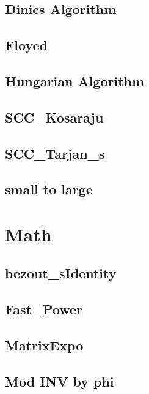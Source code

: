 ﻿\documentclass[10pt,twocolumn]{article}
\newcommand{\codefile}[1]{}}
\begin{document}
\subsection{Dinics Algorithm}
\codefile{Graph/Dinics Algorithm.cpp}

\subsection{Floyed}
\codefile{Graph/Floyed.cpp}

\subsection{Hungarian Algorithm}
\codefile{Graph/Hungarian Algorithm.cpp}

\subsection{SCC\_Kosaraju}
\codefile{Graph/SCC_Kosaraju.cpp}

\subsection{SCC\_Tarjan\_s}
\codefile{Graph/SCC_Tarjan_s.cpp}

\subsection{small to large}
\codefile{Graph/small to large.cpp}

\section{Math}
\subsection{bezout\_sIdentity}
\codefile{Math/bezout_sIdentity.cpp}

\subsection{Fast\_Power}
\codefile{Math/Fast_Power.cpp}

\subsection{MatrixExpo}
\codefile{Math/MatrixExpo.cpp}

\subsection{Mod INV by phi}
\codefile{Math/Mod INV by phi.cpp}
\end{document}
